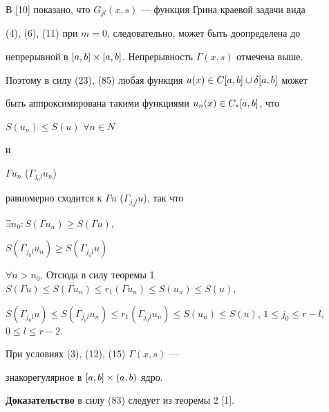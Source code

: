 В [10] показано, что $G_{jl}(x,s)$ --- функция Грина краевой задачи вида


(4), (6), (11) при $m=0$, следовательно, может быть доопределена до


непрерывной в $[a,b]\times[a,b]$. Непрерывность $\Gamma(x,s)$ отмечена выше.


Поэтому в силу (23), (85) любая функция $u(x)\in C[a,b]\cup\delta[a,b]$ может


быть аппроксимирована такими функциями $u_n(x)\in C_{*}[a,b]$, что


$S(u_n)\le S(u)$ \; $\forall n\in N$


и


$\Gamma u_n$ ($\Gamma_{j_0l}u_n$)


равномерно сходится к $\Gamma u$ ($\Gamma_{j_0l}u$), так что


$\exists n_0: S(\Gamma u_n)\ge S(\Gamma u)$,


$S(\Gamma_{j_0l} u_n)\ge S(\Gamma_{j_0l} u)$


\; $\forall n>n_0$. Отсюда в силу теоремы 1 \ $S(\Gamma u)\le


S(\Gamma u_n)\le r_1(\Gamma u_n)\le S(u_n)\le S(u)$, 


$S(\Gamma_{j_0l} u)\le S(\Gamma_{j_0l} u_n)\le r_1(\Gamma_{j_0l} u_n)\le


S(u_n)\le S(u)$, $1\le j_0\le r-l$, $0\le l\le r-2$.








\begin{cornonum} 


При условиях (3), (12), (15) $\Gamma(x,s)$ ---


знакорегулярное в $[a,b]\times(a,b)$ ядро.


\end{cornonum}








{\bf Доказательство} в силу (83) следует из теоремы 2 [1].









